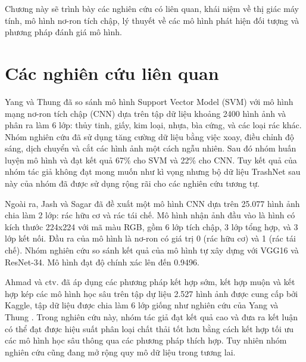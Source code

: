 \documentclass[../the.tex]{subfiles}
\begin{document}
{\fontsize{13}{12} \selectfont
Chương này sẽ trình bày các nghiên cứu có liên quan, khái niệm về thị giác máy tính, mô hình nơ-ron tích chập, lý thuyết về các mô hình phát hiện đối tượng và phương pháp đánh giá mô hình.
}

\section{Các nghiên cứu liên quan}
\label{sec:nnlq}
{\fontsize{13}{12} \selectfont

	Yang và Thung \cite{yang2016classification} đã so sánh mô hình Support Vector Model (SVM) với
	mô hình mạng nơ-ron tích chập (CNN) dựa trên tập dữ liệu khoảng 2400 hình
	ảnh và phân ra làm 6 lớp: thủy tinh, giấy, kim loại, nhựa, bìa cứng, và các loại
	rác khác. Nhóm nghiên cứu đã sử dụng tăng cường dữ liệu bằng việc xoay, điều chỉnh độ sáng,
	dịch chuyển và cắt các hình ảnh một cách ngẫu nhiên. Sau đó nhóm huấn luyện mô hình và đạt kết quả 67\% cho SVM và 22\% cho CNN.
	Tuy kết quả của nhóm tác giả không đạt mong muốn như kì vọng nhưng bộ dữ liệu TrashNet sau này của nhóm đã được sử dụng rộng rãi cho các nghiên cứu tương tự.
}

\bigskip

{\fontsize{13}{12} \selectfont

	Ngoài ra, Jash và Sagar \cite{shah2022method} đã đề xuất một mô hình CNN dựa trên 25.077
	hình ảnh chia làm 2 lớp: rác hữu cơ và rác tái chế. Mô hình nhận ảnh đầu vào là
	hình có kích thước 224x224 với mã màu RGB, gồm 6 lớp tích chập, 3 lớp tổng
	hợp, và 3 lớp kết nối. Đầu ra của mô hình là nơ-ron
	có giá trị 0 (rác hữu cơ) và 1 (rác tái chế). Nhóm nghiên cứu so sánh kết quả
	của mô hình tự xây dựng với VGG16 \cite{simonyan2014very} và ResNet-34.
	Mô hình đạt độ chính xác lên đến 0.9496.
}

\bigskip

{\fontsize{13}{12} \selectfont

	Ahmad và ctv. \cite{ahmad2020intelligent} đã áp dụng các phương pháp kết hợp sớm, kết hợp muộn
	và kết hợp kép các mô hình học sâu trên tập dự liệu 2.527 hình ảnh được cung cấp bởi Kaggle, tập dữ liệu
	được chia làm 6 lớp giống như nghiên cứu của Yang và Thung \cite{yang2016classification}. Trong nghiên cứu này,
	nhóm tác giả đạt kết quả cao và đưa ra kết luận có thể đạt được hiệu suất phân
	loại chất thải tốt hơn bằng cách kết hợp tối ưu các mô hình học sâu thông qua
	các phương pháp thích hợp. Tuy nhiên nhóm nghiên cứu cũng đang mở rộng
	quy mô dữ liệu trong tương lai.
}
\end{document}
